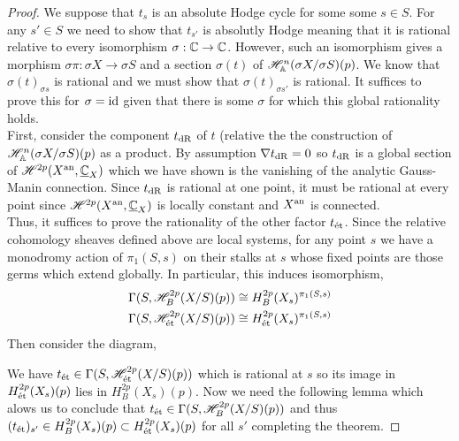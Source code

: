 \documentclass[12pt]{article}
\begin{document}
\begin{proof}
We suppose that $t_s$ is an absolute Hodge cycle for some some $s \in S$. For any $s' \in S$ we need to show that $t_{s'}$ is absolutly Hodge meaning that it is rational relative to every isomorphism $\sigma : \mathbb{C} \to \mathbb{C}$. However, such an isomorphism gives a morphism $\sigma \pi : \sigma X \to \sigma S$ and a section $\sigma(t)$ of $\mathscr{H}^n_{\mathbb{A}}(\sigma X / \sigma S)(p)$. We know that $\sigma(t)_{\sigma s}$ is rational and we must show that $\sigma(t)_{\sigma s'}$ is rational. It suffices to prove this for $\sigma = \mathrm{id}$ given that there is some $\sigma$ for which this global rationality holds.
\bigskip\\
First, consider the component $t_{\mathrm{dR}}$ of $t$ (relative the the construction of $\mathscr{H}^n_{\mathbb{A}}(\sigma X / \sigma S)(p)$ as a product. By assumption $\nabla t_{\mathrm{dR}} = 0$ so $t_{\mathrm{dR}}$ is a global section of $\mathscr{H}^{2p}(X^{\mathrm{an}}, \underline{\mathbb{C}}_X)$ which we have shown is the vanishing of the analytic Gauss-Manin connection. Since $t_{\mathrm{dR}}$ is rational at one point, it must be rational at every point since $\mathscr{H}^{2p}(X^{\mathrm{an}}, \underline{\mathbb{C}}_X)$ is locally constant and $X^{\mathrm{an}}$ is connected. 
\bigskip\\
Thus, it suffices to prove the rationality of the other factor $t_{\text{\'{e}t}}$. Since the relative cohomology sheaves defined above are local systems, for any point $s$ we have a monodromy action of $\pi_1(S, s)$ on their stalks at $s$ whose fixed points are those germs which extend globally. In particular, this induces isomorphism,
\begin{align*}
\Gamma(S, \mathscr{H}_B^{2p}(X/S)(p)) \cong H^{2p}_B(X_s)^{\pi_1(S,s)}
\\
\Gamma(S, \mathscr{H}_{\text{\'{e}t}}^{2p}(X/S)(p)) \cong H^{2p}_{\text{\'{e}t}}(X_s)^{\pi_1(S,s)}
\end{align*}
Then consider the diagram,
\begin{center}
\end{center}
We have $t_{\text{\'{e}t}} \in \Gamma(S, \mathscr{H}^{2 p}_{\text{\'{e}t}}(X / S)(p))$ which is rational at $s$ so its image in $H^{2 p}_{\text{\'{e}t}}(X_s)(p)$ lies in $H^{2 p}_B(X_s)(p)$. Now we need the following lemma which alows us to conclude that $t_{\text{\'{e}t}} \in \Gamma(S, \mathscr{H}^{2p}_B(X/S)(p))$ and thus $(t_{\text{\'{e}t}})_{s'} \in H^{2 p}_B(X_s)(p) \subset H^{2p}_{\text{\'{e}t}}(X_s)(p)$ for all $s'$ completing the theorem.
\end{proof}
\end{document}
